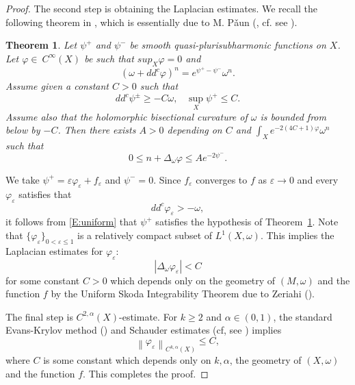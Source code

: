 \documentclass{amsart}
\newtheorem{theorem}{Theorem}[section]
\theoremstyle{definition}
\numberwithin{equation}{section}
\begin{document}
\begin{proof}
The second step is obtaining the Laplacian estimates. We recall the following theorem in \cite{Di Nezza_Lu}, which is essentially due to M. P\v{a}un  (\cite{Paun1}, cf. see \cite{Siu}).
\begin{theorem}\label{T:Laplacian}
Let $\psi^+$ and $\psi^-$ be smooth quasi-plurisubharmonic functions on $X$. Let $\varphi\in~C^\infty(X)$ be such that $sup_X\varphi=0$ and
\begin{equation*}
(\omega+dd^c\varphi)^n
=
e^{\psi^+-\psi^-}\omega^n.
\end{equation*}
Assume given a constant $C>0$ such that
\begin{equation*}
dd^c\psi^\pm\ge-C\omega,
\;\;\;
\sup_X\psi^+\le C.
\end{equation*}
Assume also that the holomorphic bisectional curvature of $\omega$ is bounded from below by $-C$. Then there exists $A>0$ depending on $C$ and $\int_Xe^{-2(4C+1)\varphi}\omega^n$ such that
\begin{equation*}
0\le
n+\Delta_\omega\varphi
\le
Ae^{-2\psi^-}.
\end{equation*}
\end{theorem}

We take $\psi^+={\varepsilon}{\varphi}_{\varepsilon}+f_{\varepsilon}$ and $\psi^-=0$. Since $f_{\varepsilon}$ converges to $f$ as ${\varepsilon}\rightarrow0$ and every ${\varphi}_{\varepsilon}$ satisfies that
\begin{equation*}
dd^c{\varphi}_{\varepsilon} > -\omega,
\end{equation*}
it follows from \eqref{E:uniform} that $\psi^+$ satisfies the hypothesis of Theorem~\ref{T:Laplacian}. Note that $\{{\varphi}_{\varepsilon}\}_{0<{\varepsilon}\le1}$ is a relatively compact subset of $L^1(X,\omega)$. This implies the Laplacian estimates for ${\varphi}_{\varepsilon}$:
\begin{equation*}
{\left\vert{\Delta_\omega{\varphi}_{\varepsilon}}\right\vert}<C
\end{equation*}
for some constant $C>0$ which depends only on the geometry of $(M,\omega)$ and the function $f$ by the Uniform Skoda Integrability Theorem due to Zeriahi (\cite{Zeriahi}).
\medskip

The final step is $C^{2,\alpha}(X)$-estimate. For $k\ge2$ and $\alpha\in(0,1)$, the standard Evans-Krylov method (\cite{Evans, Krylov}) and Schauder estimates (cf, see \cite{Gilbarg_Trudinger}) implies
\begin{equation*}
{\left\|{{\varphi}_{\varepsilon}}\right\|}_{C^{k,\alpha}(X)}
\le
C,
\end{equation*}
where $C$ is some constant which depends only on $k,\alpha$, the geometry of $(X,\omega)$ and the function $f$. This completes the proof.
\end{proof}
\end{document}

